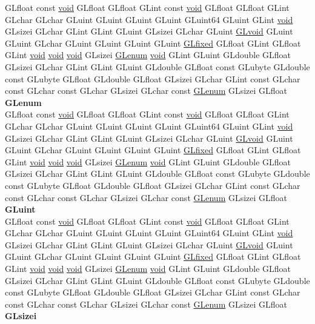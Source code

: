 \begin{DoxyCompactItemize}
\begin{tabbing}
\>GLfloat const \hyperlink{interfacevoid}{void} GLfloat GLfloat GLint const \hyperlink{interfacevoid}{void} GLfloat GLfloat GLint GLchar GLchar GLuint GLuint GLuint GLuint GLuint64 GLuint GLint \hyperlink{interfacevoid}{void} GLsizei GLchar GLint GLint GLuint GLsizei GLchar GLuint \hyperlink{interfacevoid}{GLvoid} GLuint GLuint GLchar GLuint GLuint GLuint GLuint \hyperlink{glheader_8h_ad6d3fa892df40dedf48ee6d84529ae5e}{GLfixed} GLfloat GLint GLfloat GLint \hyperlink{interfacevoid}{void} \hyperlink{interfacevoid}{void} \hyperlink{interfacevoid}{void} GLsizei \hyperlink{interfacevoid}{GLenum} \hyperlink{interfacevoid}{void} GLint GLuint GLdouble GLfloat GLsizei GLchar GLint GLint GLuint GLdouble GLfloat const GLubyte GLdouble const GLubyte GLfloat GLdouble GLfloat GLsizei GLchar GLint const GLchar const GLchar const GLchar GLsizei GLchar const \hyperlink{interfacevoid}{GLenum} GLsizei GLfloat {\bfseries GLenum}\\
\>GLfloat const \hyperlink{interfacevoid}{void} GLfloat GLfloat GLint const \hyperlink{interfacevoid}{void} GLfloat GLfloat GLint GLchar GLchar GLuint GLuint GLuint GLuint GLuint64 GLuint GLint \hyperlink{interfacevoid}{void} GLsizei GLchar GLint GLint GLuint GLsizei GLchar GLuint \hyperlink{interfacevoid}{GLvoid} GLuint GLuint GLchar GLuint GLuint GLuint GLuint \hyperlink{glheader_8h_ad6d3fa892df40dedf48ee6d84529ae5e}{GLfixed} GLfloat GLint GLfloat GLint \hyperlink{interfacevoid}{void} \hyperlink{interfacevoid}{void} \hyperlink{interfacevoid}{void} GLsizei \hyperlink{interfacevoid}{GLenum} \hyperlink{interfacevoid}{void} GLint GLuint GLdouble GLfloat GLsizei GLchar GLint GLint GLuint GLdouble GLfloat const GLubyte GLdouble const GLubyte GLfloat GLdouble GLfloat GLsizei GLchar GLint const GLchar const GLchar const GLchar GLsizei GLchar const \hyperlink{interfacevoid}{GLenum} GLsizei GLfloat {\bfseries GLuint}\\
\>GLfloat const \hyperlink{interfacevoid}{void} GLfloat GLfloat GLint const \hyperlink{interfacevoid}{void} GLfloat GLfloat GLint GLchar GLchar GLuint GLuint GLuint GLuint GLuint64 GLuint GLint \hyperlink{interfacevoid}{void} GLsizei GLchar GLint GLint GLuint GLsizei GLchar GLuint \hyperlink{interfacevoid}{GLvoid} GLuint GLuint GLchar GLuint GLuint GLuint GLuint \hyperlink{glheader_8h_ad6d3fa892df40dedf48ee6d84529ae5e}{GLfixed} GLfloat GLint GLfloat GLint \hyperlink{interfacevoid}{void} \hyperlink{interfacevoid}{void} \hyperlink{interfacevoid}{void} GLsizei \hyperlink{interfacevoid}{GLenum} \hyperlink{interfacevoid}{void} GLint GLuint GLdouble GLfloat GLsizei GLchar GLint GLint GLuint GLdouble GLfloat const GLubyte GLdouble const GLubyte GLfloat GLdouble GLfloat GLsizei GLchar GLint const GLchar const GLchar const GLchar GLsizei GLchar const \hyperlink{interfacevoid}{GLenum} GLsizei GLfloat {\bfseries GLsizei}\\

\end{tabbing}
\end{DoxyCompactItemize}
